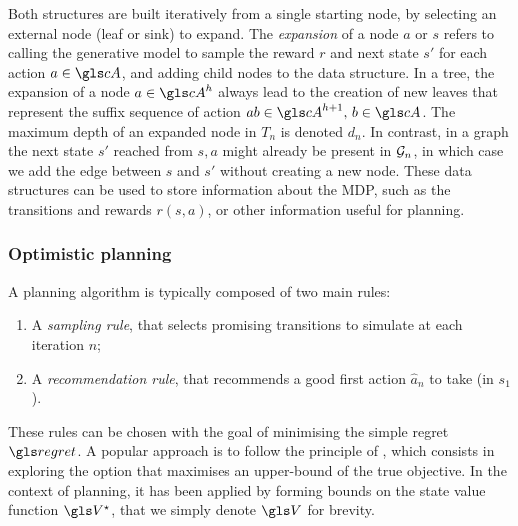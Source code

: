Both structures are built iteratively from a single starting node, by selecting an external node (leaf or sink) to expand. The \emph{expansion} of a node $a$ or $s$ refers to calling the generative model to sample the reward $r$ and next state $s'$ for each action $a\in \cA$, and adding child nodes to the data structure. In a tree, the expansion of a node $a\in \cA^h$ always lead to the creation of new leaves that represent the suffix sequence of action $ab\in \cA^{h+1},\, b\in \cA$. The maximum depth of an expanded node in $T_n$ is denoted $d_n$. In contrast, in a graph the next state $s'$ reached from $s,a$ might already be present in $\mathcal{G}_n$, in which case we add the edge between $s$ and $s'$ without creating a new node.
These data structures can be used to store information about the \gls{MDP}, such as the transitions and rewards $r(s, a)$, or other information useful for planning.



\subsubsection{Optimistic planning}

A planning algorithm is typically composed of two main rules:
\begin{enumerate}[label=(\roman*)]
	\item A \emph{sampling rule}, that selects promising transitions to simulate at each iteration $n$;
	\item A \emph{recommendation rule}, that recommends a good first action $\hat{a}_n$ to take (in $s_1$).
\end{enumerate}

These rules can be chosen with the goal of minimising the simple regret $\regret$.
A popular approach is to follow the principle of  \citep[see][]{Munos2014}, which consists in exploring the option that maximises an upper-bound of the true objective. In the context of planning, it has been applied by forming bounds on the state value function $\V^\star$, that we simply denote $\V$ for brevity.


